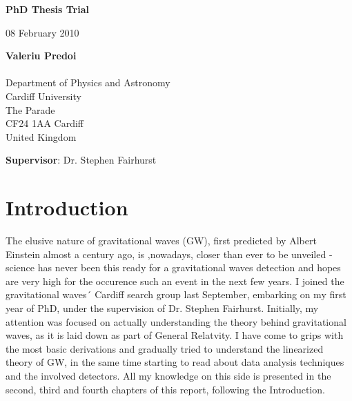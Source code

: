 \documentclass[epsf]{article}
\begin{document}
%
%
\begin{titlepage}

\vspace*{3cm}


\centerline{\huge \bf PhD Thesis Trial}
\vspace*{1cm}


\Large

\vspace*{2cm}

\centerline{08 February 2010}

\vspace*{10cm}

\begin{tabbing}
\hspace*{0.5cm} \= {\bf Valeriu Predoi}\\
\>\\
\>Department of Physics and Astronomy\\
\>Cardiff University\\
\>The Parade\\
\>CF24 1AA Cardiff\\
\>United Kingdom
\end{tabbing}


\vspace*{1cm}



{\bf Supervisor}: Dr. Stephen Fairhurst



\end{titlepage}
\newpage

\tableofcontents

\newpage

\section{Introduction}

The elusive nature of gravitational waves (GW), first predicted by Albert Einstein almost a century ago, is ,nowadays, closer than ever to be unveiled - science has never been this ready for a gravitational waves detection and hopes are very high for the occurence such an event in the next few years. I joined the gravitational waves´ Cardiff search group last September, embarking on my first year of PhD, under the supervision of Dr. Stephen Fairhurst. Initially, my attention was focused on actually understanding the theory behind gravitational waves, as it is laid down as part of General Relatvity. I have come to grips with the most basic derivations and gradually tried to understand the linearized theory of GW, in the same time starting to read about data analysis techniques and the involved detectors. All my knowledge on this side is presented in the second, third and fourth chapters of this report, following the Introduction.
\end{document}
